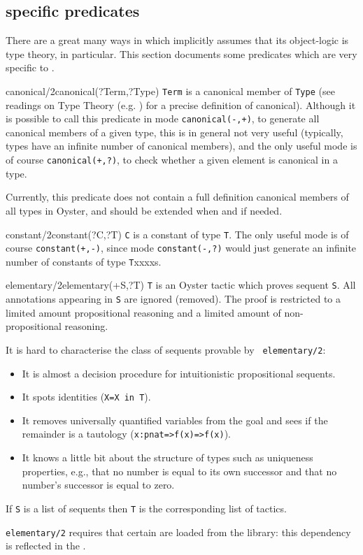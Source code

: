 \subsection {\oyster specific predicates}
There are a great many ways in which \clam implicitly assumes that its
object-logic is type theory, \oyster in particular.  This section
documents some predicates which are very specific to \oyster.


\begin{predicate}{canonical/2}{canonical(?Term,?Type)}%
{\tt Term} is a canonical member of {\tt Type} (see readings on Type
Theory (e.g. \cite{nuprl-book}) for a precise definition of
canonical). Although it is possible to call this predicate in mode
{\tt canonical(-,+)}, to generate all canonical members of a given
type, this is in general not very useful (typically, types have an
infinite number of canonical members), and the only useful mode is of
course {\tt canonical(+,?)}, to check whether a given element is
canonical in a type.

Currently, this predicate does not contain a full definition canonical
\notnice members of all types in Oyster, and should be extended when
and if needed.
\end{predicate}

\begin{predicate}{constant/2}{constant(?C,?T)}%
{\tt C} is a constant of type {\tt T}. The only useful mode is of
course {\tt constant(+,-)}, since mode {\tt constant(-,?)} would just
generate an infinite number of constants of type {\tt T}xxxxs.
\end{predicate}

\begin{predicate}{elementary/2}{elementary(+S,?T)}%
{\tt T} is an Oyster tactic which proves sequent {\tt S}. All
annotations appearing in {\tt S} are ignored (removed).  The proof is
restricted to a limited amount propositional reasoning and a limited
amount of non-propositional reasoning.

It is hard to characterise the class of sequents provable by {\tt
elementary/2}:
\begin{itemize}
\item It is almost a decision procedure for intuitionistic
      propositional sequents.
\item It spots identities ({\tt X=X in T}).
\item It removes universally quantified variables from the goal and
      sees if the remainder is a tautology ({\tt x:pnat=>f(x)=>f(x)}).
\item It knows a little bit about the structure of types such as
      uniqueness properties, e.g., that no number is equal to its own 
      successor and that no number's successor is equal to zero. 
\end{itemize}

If {\tt S} is a list of sequents then {\tt T} is the corresponding
list of tactics.

{\tt elementary/2} requires that certain  are loaded from the
library: this dependency is reflected in the .
\end{predicate}


